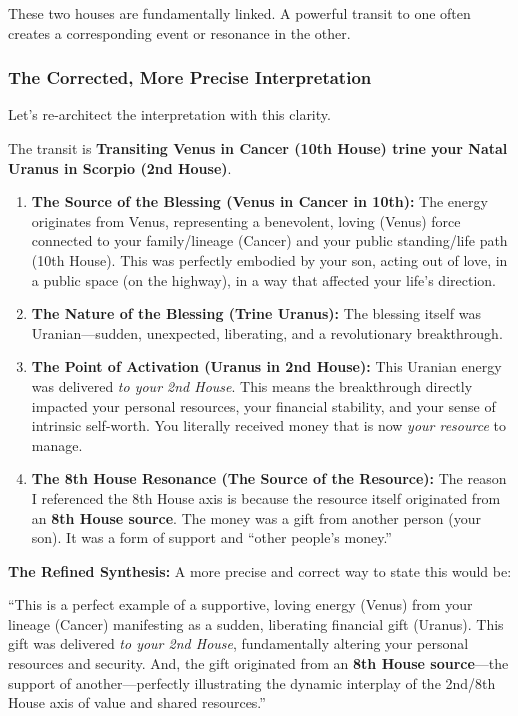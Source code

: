 \documentclass{article}
\begin{document}
These two houses are fundamentally linked. A powerful transit to one often creates a corresponding event or resonance in the other.

\subsubsection*{The Corrected, More Precise Interpretation}\label{the-corrected-more-precise-interpretation}

Let's re-architect the interpretation with this clarity.

The transit is \textbf{Transiting Venus in Cancer (10th House) trine your Natal Uranus in Scorpio (2nd House)}.

\begin{enumerate}
\def\labelenumi{\arabic{enumi}.}
\item
  \textbf{The Source of the Blessing (Venus in Cancer in 10th):} The energy originates from Venus, representing a benevolent, loving (Venus) force connected to your family/lineage (Cancer) and your public standing/life path (10th House). This was perfectly embodied by your son, acting out of love, in a public space (on the highway), in a way that affected your life's direction.
\item
  \textbf{The Nature of the Blessing (Trine Uranus):} The blessing itself was Uranian---sudden, unexpected, liberating, and a revolutionary breakthrough.
\item
  \textbf{The Point of Activation (Uranus in 2nd House):} This Uranian energy was delivered \emph{to your 2nd House}. This means the breakthrough directly impacted your personal resources, your financial stability, and your sense of intrinsic self-worth. You literally received money that is now \emph{your resource} to manage.
\item
  \textbf{The 8th House Resonance (The Source of the Resource):} The reason I referenced the 8th House axis is because the resource itself originated from an \textbf{8th House source}. The money was a gift from another person (your son). It was a form of support and ``other people's money.''
\end{enumerate}

\textbf{The Refined Synthesis:} A more precise and correct way to state this would be:

``This is a perfect example of a supportive, loving energy (Venus) from your lineage (Cancer) manifesting as a sudden, liberating financial gift (Uranus). This gift was delivered \emph{to your 2nd House}, fundamentally altering your personal resources and security. And, the gift originated from an \textbf{8th House source}---the support of another---perfectly illustrating the dynamic interplay of the 2nd/8th House axis of value and shared resources.''
\end{document}
